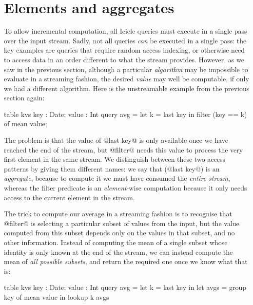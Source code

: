 
\section{Elements and aggregates}
\label{icicle:s:ElementsAndAggregates}
To allow incremental computation, all Icicle queries must execute in a single pass over the input stream.
Sadly, not all queries \emph{can} be executed in a single pass: the key examples are queries that require random access indexing, or otherwise need to access data in an order different to what the stream provides.
However, as we saw in the previous section, although a particular \emph{algorithm} may be impossible to evaluate in a streaming fashion, the desired \emph{value} may well be computable, if only we had a different algorithm.
Here is the unstreamable example from the previous section again:
\begin{icicle}
  table kvs { key : Date; value : Int }
  query avg = let k = last key
              in  filter (key == k) of mean value;
\end{icicle}

The problem is that the value of @last key@ is only available once we have reached the end of the stream, but @filter@ needs this value to process the very first element in the same stream.
We distinguish between these two access patterns by giving them different names: we say that (@last key@) is an \emph{aggregate}, because to compute it we must have consumed the \emph{entire stream}, whereas the filter predicate is an \emph{element}-wise computation because it only needs access to the current element in the stream.

The trick to compute our average in a streaming fashion is to recognise that @filter@ is selecting a particular subset of values from the input, but the value computed from this subset depends only on the values in that subset, and no other information. Instead of computing the mean of a single subset whose identity is only known at the end of the stream, we can instead compute the mean of \emph{all possible subsets}, and return the required one once we know what that is:
\begin{icicle}
  table kvs { key : Date; value : Int } 
  query avg = let k    = last  key in
              let avgs = group key of mean value
              in  lookup k avgs
\end{icicle}

